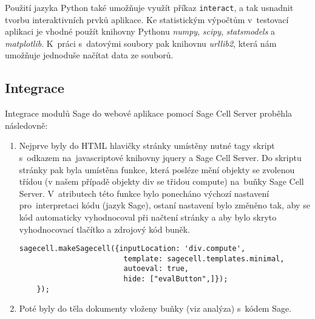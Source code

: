 \documentclass[thesis=B,czech]{FITthesis}[2012/06/26]
\begin{document}
Použití jazyka Python také umožňuje využít příkaz \texttt{interact}, a tak usnadnit tvorbu interaktivních prvků aplikace. Ke statistickým výpočtům v~testovací aplikaci je vhodné použít knihovny Pythonu \textit{numpy}, \textit{scipy}, \textit{statsmodels} a \textit{matplotlib}. K~práci s~datovými soubory pak knihovnu \textit{urllib2}, která nám umožňuje jednoduše načítat data ze souborů. 


\subsection{Integrace}
Integrace modulů Sage do webové aplikace pomocí Sage Cell Server proběhla následovně:

\begin{enumerate}
\item Nejprve byly do HTML hlavičky stránky umístěny nutné tagy skript s~odkazem na~javascriptové knihovny jquery a Sage Cell Server. Do skriptu stránky pak byla umístěna funkce, která posléze mění objekty se zvolenou třídou (v našem případě objekty div se třidou compute) na~buňky Sage Cell Server. V~atributech této funkce bylo ponecháno výchozí nastavení pro~interpretaci kódu (jazyk Sage), ostaní nastavení bylo změněno tak, aby se kód automaticky vyhodnocoval při načtení stránky a aby bylo skryto vyhodnocovací tlačítko a zdrojový kód buněk.

\begin{verbatim}
sagecell.makeSagecell({inputLocation: 'div.compute',
                        template: sagecell.templates.minimal,
                        autoeval: true,
                        hide: ["evalButton",]});
    });
\end{verbatim}

\item Poté byly do těla dokumenty vloženy buňky (viz analýza) s~kódem Sage.
\end{enumerate}
\end{document}

